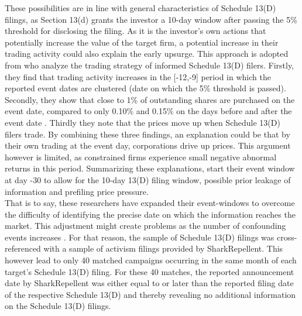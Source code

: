 \documentclass[12pt]{article}
\begin{document}
These possibilities are in line with general characteristics of Schedule 13(D) filings, as Section 13(d) grants the investor a 10-day window after passing the 5\% threshold for disclosing the filing. 
As it is the investor's own actions that potentially increase the value of the target firm, a potential increase in their trading activity could also explain the early upsurge. This approach is adopted from  \citet[p.1561]{Collin-Dufresne2015} who analyze the trading strategy of informed Schedule 13(D) filers. Firstly, they find that trading activity increases in the [-12,-9] period in which the reported event dates are clustered (date on which the 5\% threshold is passed). Secondly, they show that close to 1\% of outstanding shares are purchased on the event date, compared to only 0.10\% and 0.15\% on the days before and after the event date \citep[p.1561]{Collin-Dufresne2015}. Thirdly they note that the prices move up when Schedule 13(D) filers trade. By combining these three findings, an explanation could be that by their own trading at the event day, corporations drive up prices. This argument however is limited, as constrained firms experience small negative abnormal returns in this period. Summarizing these explanations, \citet[p.207]{Klein2009} start their event window at day -30 to allow for the 10-day 13(D) filing window, possible prior leakage of information and prefiling price pressure.\\
That is to say, these researchers have expanded their event-windows to overcome the difficulty of identifying the precise date on which the information reaches the market. This adjustment might create problems as the number of confounding events increases \citep[p.352]{mcwilliams1999}. For that reason, the sample of Schedule 13(D) filings was cross-referenced with a sample of activism filings provided by SharkRepellent. This however lead to only 40 matched campaigns occurring in the same month of each target's Schedule 13(D) filing. For these 40 matches, the reported announcement date by SharkRepellent was either equal to or later than the reported filing date of the respective Schedule 13(D) and thereby revealing no additional information on the Schedule 13(D) filings.
\end{document}
